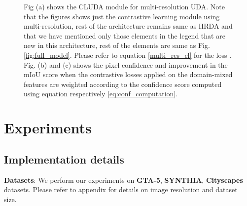 \documentclass{article}
\begin{document}
\begin{figure}[h!]
\hspace{-1.0cm}
\caption{Fig (a) shows the CLUDA module for multi-resolution UDA. Note that the figures shows just the contrastive learning module using multi-resolution, rest of the architecture remains same as HRDA\cite{hoyer2022hrda} and that we have mentioned only those elements in the legend that are new in this architecture, rest of the elements are same as Fig. \ref{fig:full_model}. Please refer to equation \ref{multi_res_cl} for the loss . Fig. (b) and (c) shows the pixel confidence and improvement in the mIoU score when the contrastive losses applied on the domain-mixed features are weighted according to the confidence score computed using equation respectively \ref{eq:conf_computation}.}
\label{confidence_improvement_graph}
\end{figure}

\section{Experiments}









\subsection{Implementation details}
\textbf{Datasets}: We perform our experiments on \textbf{GTA-5}\cite{richter2016playing}, \textbf{SYNTHIA}\cite{ros2016synthia}, \textbf{Cityscapes}\cite{cordts2016Cityscapes} datasets. Please refer to appendix for details on image resolution and dataset size.
\end{document}
